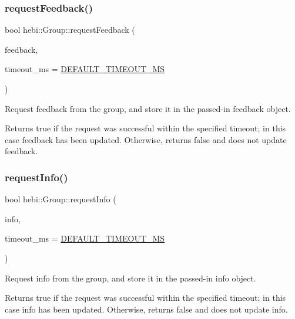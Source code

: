 \subsubsection{\texorpdfstring{request\+Feedback()}{requestFeedback()}}
{\footnotesize\ttfamily bool hebi\+::\+Group\+::request\+Feedback (\begin{DoxyParamCaption}\item[{\hyperlink{classhebi_1_1GroupFeedback}{Group\+Feedback} $\ast$}]{feedback,  }\item[{int}]{timeout\+\_\+ms = {\ttfamily \hyperlink{classhebi_1_1Group_a3d01ca6dbd28ec984cda196a77056dd4}{D\+E\+F\+A\+U\+L\+T\+\_\+\+T\+I\+M\+E\+O\+U\+T\+\_\+\+MS}} }\end{DoxyParamCaption})}



Request feedback from the group, and store it in the passed-\/in feedback object. 

\begin{DoxyReturn}{Returns}
true if the request was successful within the specified timeout; in this case \textquotesingle{}feedback\textquotesingle{} has been updated. Otherwise, returns false and does not update \textquotesingle{}feedback\textquotesingle{}. 
\end{DoxyReturn}
\mbox{\label{classhebi_1_1Group_a1065ad12a649d135758c1b6a95df650e}} 
\subsubsection{\texorpdfstring{request\+Info()}{requestInfo()}}
{\footnotesize\ttfamily bool hebi\+::\+Group\+::request\+Info (\begin{DoxyParamCaption}\item[{\hyperlink{classhebi_1_1GroupInfo}{Group\+Info} $\ast$}]{info,  }\item[{int}]{timeout\+\_\+ms = {\ttfamily \hyperlink{classhebi_1_1Group_a3d01ca6dbd28ec984cda196a77056dd4}{D\+E\+F\+A\+U\+L\+T\+\_\+\+T\+I\+M\+E\+O\+U\+T\+\_\+\+MS}} }\end{DoxyParamCaption})}



Request info from the group, and store it in the passed-\/in info object. 

\begin{DoxyReturn}{Returns}
true if the request was successful within the specified timeout; in this case \textquotesingle{}info\textquotesingle{} has been updated. Otherwise, returns false and does not update \textquotesingle{}info\textquotesingle{}. 
\end{DoxyReturn}
\mbox{\label{classhebi_1_1Group_a3645f8c1019e6949dc64fbdec7f73442}} 
